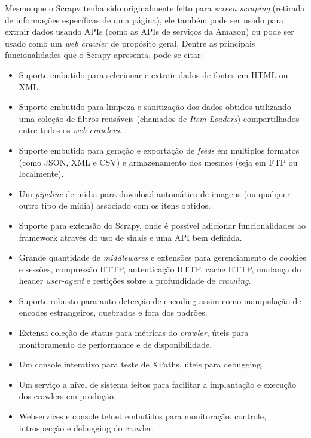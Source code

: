 Mesmo que o Scrapy tenha sido originalmente feito para \emph{screen scraping} (retirada de informações específicas de uma página), ele também pode ser usado para extrair dados usando APIs (como as APIs de serviços da Amazon) ou pode ser usado como um \emph{web crawler} de propósito geral.
Dentre as principais funcionalidades que o Scrapy apresenta, pode-se citar:

\begin{itemize}
	\item Suporte embutido para selecionar e extrair dados de fontes em HTML ou XML.
	\item Suporte embutido para limpeza e sanitização dos dados obtidos utilizando uma coleção de filtros reusáveis (chamados de \emph{Item Loaders}) compartilhados entre todos os \emph{web crawlers}.
	\item Suporte embutido para geração e exportação de \emph{feeds} em múltiplos formatos (como JSON, XML e CSV) e armazenamento dos mesmos (seja em FTP ou localmente).
	\item Um \emph{pipeline} de mídia para download automático de imagens (ou qualquer outro tipo de mídia) associado com os itens obtidos.
	\item Suporte para extensão do Scrapy, onde é possível adicionar funcionalidades ao framework através do uso de sinais e uma API bem definida.
	\item Grande quantidade de \emph{middlewares} e extensões para gerenciamento de cookies e sessões, compressão HTTP, autenticação HTTP, cache HTTP, mudança do header \emph{user-agent} e restições sobre a profundidade de \emph{crawling}.
	\item Suporte robusto para auto-detecção de encoding assim como manipulação de encodes estrangeiros, quebrados e fora dos padrões.
	\item Extensa coleção de status para métricas do \emph{crawler}, úteis para monitoramento de performance e de disponibilidade.
	\item Um console interativo para teste de XPaths, úteis para debugging.
	\item Um serviço a nível de sistema feitos para facilitar a implantação e execução dos crawlers em produção.
	\item Webservices e console telnet embutidos para monitoração, controle, introspecção e debugging do crawler.
\end{itemize}


